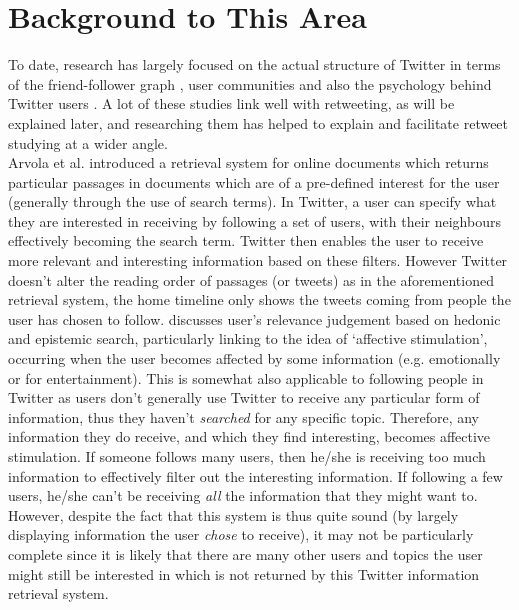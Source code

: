 \section{Background to This Area}
\label{related work}
To date, research has largely focused on the actual structure of Twitter in terms of the friend-follower graph \cite{krish08}, user communities \cite{java07} and also the psychology behind Twitter users \cite{zhao09} \cite{cha10}. A lot of these studies link well with retweeting, as will be explained later, and researching them has helped to explain and facilitate retweet studying at a wider angle.\\
Arvola et al. \cite{arvola10} introduced a retrieval system for online documents which returns particular passages in documents which are of a pre-defined interest for the user (generally through the use of search terms). In Twitter, a user can specify what they are interested in receiving by following a set of users, with their neighbours effectively becoming the search term. Twitter then enables the user to receive more relevant and interesting information based on these filters. However Twitter doesn't alter the reading order of passages (or tweets) as in the aforementioned retrieval system, the home timeline only shows the tweets coming from people the user has chosen to follow. \cite{xu07} discusses user's relevance judgement based on hedonic and epistemic search, particularly linking to the idea of `affective stimulation', occurring when the user becomes affected by some information (e.g. emotionally or for entertainment). This is somewhat also applicable to following people in Twitter as users don't generally use Twitter to receive any particular form of information, thus they haven't \textit{searched} for any specific topic. Therefore, any information they do receive, and which they find interesting, becomes affective stimulation. If someone follows many users, then he/she is receiving too much information to effectively filter out the interesting information. If following a few users, he/she can't be receiving \textit{all} the information that they might want to.\\
 However, despite the fact that this system is thus quite sound (by largely displaying information the user \textit{chose} to receive), it may not be particularly complete since it is likely that there are many other users and topics the user might still be interested in which is not returned by this Twitter information retrieval system.
